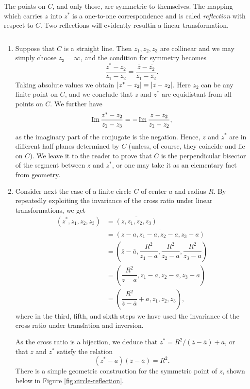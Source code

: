 The points on $C$, and only those, are symmetric to themselves. The mapping which carries $z$ into $z^*$ is a one-to-one correspondence and is caled \emph{reflection} with respect to $C$. Two reflections will evidently resultin a linear transformation.

\begin{example}
	$ $
	\begin{enumerate}
		\item Suppose that $C$ is a straight line. Then $z_1,z_2,z_3$ are collinear and we may simply choose $z_3=\infty$, and the condition for symmetry becomes $$\dfrac{z^*-z_2}{z_1-z_2}=\dfrac{\overline{z}-\overline{z_2}}{\overline{z_1}-\overline{z_2}}.$$ Taking absolute values we obtain $\lvert z^*-z_2 \rvert=\lvert z-z_2 \rvert$. Here $z_2$ can be any finite point on $C$, and we conclude that $z$ and $z^*$ are equidistant from all points on $C$. We further have $$\operatorname{Im} \dfrac{z^*-z_2}{z_1-z_3}=-\operatorname{Im} \dfrac{z-z_2}{z_1-z_2},$$ as the imaginary part of the conjugate is the negation. Hence, $z$ and $z^*$ are in different half planes determined by $C$ (unless, of course, they coincide and lie on $C$). We leave it to the reader to prove that $C$ is the perpendicular bisector of the segment between $z$ and $z^*$, or one may take it as an elementary fact from geometry.
		
		\item Consider next the case of a finite circle $C$ of center $a$ and radius $R$. By repeatedly exploiting the invariance of the cross ratio under linear transformations, we get
		\begin{align*}
			(z^*,z_1,z_2,z_3) &=\overline{(z,z_1,z_2,z_3)} \\
			&=\overline{(z-a,z_1-a,z_2-a,z_3-a)} \\
			&=\left(\overline{z}-\overline{a},\dfrac{R^2}{z_1-a},\dfrac{R^2}{z_2-a},\dfrac{R^2}{z_3-a}\right) \\
			&=\left(\dfrac{R^2}{\overline{z}-\overline{a}},z_1-a,z_2-a,z_3-a\right) \\
			&=\left(\dfrac{R^2}{\overline{z}-\overline{a}}+a,z_1,z_2,z_3\right),
		\end{align*}
		where in the third, fifth, and sixth steps we have used the invariance of the cross ratio under translation and inversion.
		
		As the cross ratio is a bijection, we deduce that $z^*=R^2/(\overline{z}-\overline{a})+a$, or that $z$ and $z^*$ satisfy the relation $$(z^*-a)(\overline{z}-\overline{a})=R^2.$$ There is a simple geometric construction for the symmetric point of $z$, shown below in Figure \ref{fig:circle-reflection}.
	\end{enumerate}
\end{example}

